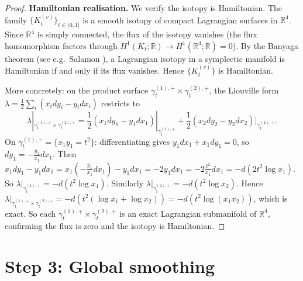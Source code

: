 \documentclass[12pt]{article}
\theoremstyle{definition}
\begin{document}
\begin{proof}
\medskip
\noindent\textbf{Hamiltonian realisation.} We verify the isotopy is Hamiltonian. The family $\{K_t^{(v)}\}_{t\in(0,1]}$ is a smooth isotopy of compact Lagrangian surfaces in $\mathbb{R}^4$. Since $\mathbb{R}^4$ is simply connected, the flux of the isotopy vanishes (the flux homomorphism factors through $H^1(K_t;\mathbb{R}) \to H^1(\mathbb{R}^4;\mathbb{R}) = 0$). By the Banyaga theorem (see e.g.\ Salamon \cite{salamon}), a Lagrangian isotopy in a symplectic manifold is Hamiltonian if and only if its flux vanishes. Hence $\{K_t^{(v)}\}$ is Hamiltonian.

More concretely: on the product surface $\gamma_t^{(1),+}\times\gamma_t^{(2),+}$, the Liouville form $\lambda = \frac{1}{2}\sum_i(x_i dy_i - y_i dx_i)$ restricts to
\[
  \lambda|_{\gamma_t^{(1),+}\times\gamma_t^{(2),+}}
  = \frac{1}{2}(x_1 dy_1 - y_1 dx_1)|_{\gamma_t^{(1),+}}
  + \frac{1}{2}(x_2 dy_2 - y_2 dx_2)|_{\gamma_t^{(2),+}}.
\]
On $\gamma_t^{(1),+} = \{x_1y_1=t^2\}$: differentiating gives $y_1 dx_1 + x_1 dy_1 = 0$, so $dy_1 = -\frac{y_1}{x_1}dx_1$. Then
$x_1 dy_1 - y_1 dx_1 = x_1(-\frac{y_1}{x_1}dx_1) - y_1 dx_1 = -2y_1 dx_1 = -2\frac{t^2}{x_1}dx_1 = -d(2t^2\log x_1)$.
So $\lambda|_{\gamma_t^{(1),+}} = -d(t^2\log x_1)$. Similarly $\lambda|_{\gamma_t^{(2),+}} = -d(t^2\log x_2)$. Hence $\lambda|_{\gamma_t^{(1),+}\times\gamma_t^{(2),+}} = -d(t^2(\log x_1+\log x_2)) = -d(t^2\log(x_1 x_2))$, which is exact. So each $\gamma_t^{(1),+}\times\gamma_t^{(2),+}$ is an exact Lagrangian submanifold of $\mathbb{R}^4$, confirming the flux is zero and the isotopy is Hamiltonian.
\end{proof}

\section*{Step 3: Global smoothing}
\end{document}
